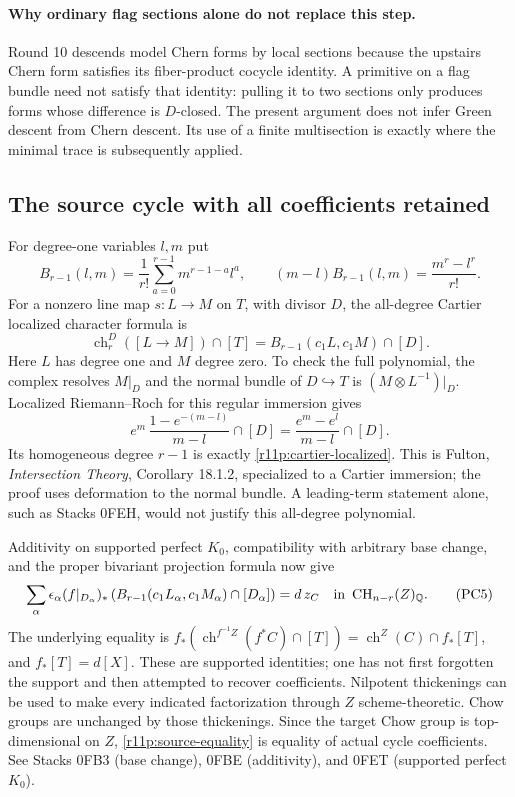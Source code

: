 \paragraph{Why ordinary flag sections alone do not replace this step.}
Round 10 descends model Chern forms by local sections because the
upstairs Chern form satisfies its fiber-product cocycle identity.
A primitive on a flag bundle need not satisfy that identity: pulling
it to two sections only produces forms whose difference is $D$-closed.
The present argument does not infer Green descent from Chern descent.
Its use of a finite multisection is exactly where the minimal trace is
subsequently applied.

\subsection{The source cycle with all coefficients retained}

For degree-one variables $l,m$ put
\[
 B_{r-1}(l,m)=\frac1{r!}\sum_{a=0}^{r-1}m^{r-1-a}l^a,
 \qquad
                  (m-l)B_{r-1}(l,m)=\frac{m^r-l^r}{r!}.
\tag{PC3}\label{r11p:B-polynomial}
\]
For a nonzero line map $s:L\to M$ on $T$, with divisor $D$, the
all-degree Cartier localized character formula is
\[
 \operatorname{ch}^{D}_r([L\to M])\cap[T]
         =B_{r-1}(c_1L,c_1M)\cap[D].
\tag{PC4}\label{r11p:cartier-localized}
\]
Here $L$ has degree one and $M$ degree zero.  To check the full
polynomial, the complex resolves $M|_D$ and the normal bundle of
$D\hookrightarrow T$ is $(M\otimes L^{-1})|_D$.  Localized
Riemann--Roch for this regular immersion gives
\[
 e^m\,\frac{1-e^{-(m-l)}}{m-l}\cap[D]
                         =\frac{e^m-e^l}{m-l}\cap[D].
\]
Its homogeneous degree $r-1$ is exactly \eqref{r11p:cartier-localized}.
This is Fulton, \emph{Intersection Theory}, Corollary 18.1.2,
specialized to a Cartier immersion; the proof uses deformation to the
normal bundle.  A leading-term statement alone, such as Stacks 0FEH,
would not justify this all-degree polynomial.

Additivity on supported perfect $K_0$, compatibility with arbitrary
base change, and the proper bivariant projection formula now give
\[
 \sum_\alpha\epsilon_\alpha
    (f|_{D_\alpha})_*
       \left(B_{r-1}(c_1L_\alpha,c_1M_\alpha)\cap[D_\alpha]\right)
                              =d\,z_C
       \quad\hbox{in }\operatorname{CH}_{n-r}(Z)_{\mathbb Q}.
\tag{PC5}\label{r11p:source-equality}
\]
The underlying equality is
$f_*(\operatorname{ch}^{f^{-1}Z}(f^*C)\cap[T])
=\operatorname{ch}^Z(C)\cap f_*[T]$, and $f_*[T]=d[X]$.
These are supported identities; one has not first forgotten the
support and then attempted to recover coefficients.  Nilpotent
thickenings can be used to make every indicated factorization through
$Z$ scheme-theoretic.  Chow groups are unchanged by those thickenings.
Since the target Chow group is top-dimensional on $Z$,
\eqref{r11p:source-equality} is equality of actual cycle coefficients.
See Stacks 0FB3 (base change), 0FBE (additivity), and 0FET (supported
perfect $K_0$).

